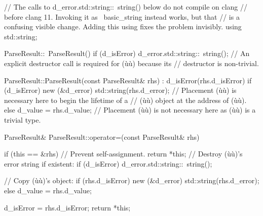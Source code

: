 %
%
%
%
\begin{emcppshiddenlisting}[emcppsbatch=e6]
// The calls to d_error.std::string::~string() below do not compile on clang
// before clang 11.  Invoking it as ~basic_string instead works, but that
// is a confusing visible change.  Adding this using fixes the problem invisibly.
using std::string;
\end{emcppshiddenlisting}
\begin{emcppslisting}[emcppsbatch=e6]
ParseResult::~ParseResult()
{
    if (d_isError)
    {
        d_error.std::string::~string();
            // An explicit destructor call is required for (ù{}ù) because its
            // destructor is non-trivial.
    }
}

ParseResult::ParseResult(const ParseResult& rhs) : d_isError(rhs.d_isError)
{
    if (d_isError)
    {
        new (&d_error) std::string(rhs.d_error);
            // Placement (ù{}ù) is necessary here to begin the lifetime of a
            // (ù{}ù) object at the address of (ù{}ù).
    }
    else
    {
        d_value = rhs.d_value;
            // Placement (ù{}ù) is not necessary here as (ù{}ù) is a trivial type.
    }
}

ParseResult& ParseResult::operator=(const ParseResult& rhs)
{
    if (this == &rhs) // Prevent self-assignment.
    {
        return *this;
    }
    // Destroy (ù{}ù)'s error string if existent:
    if (d_isError) { d_error.std::string::~string(); }

    // Copy (ù{}ù)'s object:
    if (rhs.d_isError) { new (&d_error) std::string(rhs.d_error); }
    else               { d_value = rhs.d_value; }

    d_isError = rhs.d_isError;
    return *this;
}
\end{emcppslisting}
